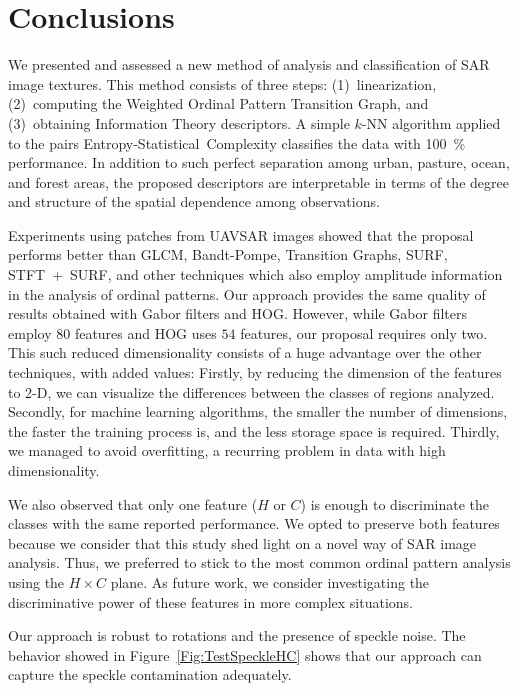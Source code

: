 \documentclass[journal]{IEEEtran}
\begin{document}
	\section{Conclusions}\label{Conclusion}
	
	We presented and assessed a new method of analysis and classification of SAR image textures.
	This method consists of three steps: 
	(1)~linearization, 
	(2)~computing the Weighted Ordinal Pattern Transition Graph, and 
	(3)~obtaining Information Theory descriptors.
	A simple $k$-NN algorithm applied to the pairs Entropy-Statistical~Complexity classifies the data with \SI{100}{\percent} performance.
	In addition to such perfect separation among urban, pasture, ocean, and forest areas, the proposed descriptors are interpretable in terms of the degree and structure of the spatial dependence among observations.
	
	Experiments using patches from UAVSAR images showed that the proposal performs better than GLCM, Bandt-Pompe, Transition Graphs, SURF, \mbox{STFT + SURF}, and other techniques which also employ amplitude information in the analysis of ordinal patterns. 
	Our approach provides the same quality of results obtained with Gabor filters and HOG.
	However, while Gabor filters employ $80$ features and HOG uses $54$ features, our proposal requires only two.
	This such reduced dimensionality consists of a huge advantage over the other techniques, with added values:
	Firstly, by reducing the dimension of the features to \mbox{2-D}, we can visualize the differences between the classes of regions analyzed.
	Secondly, for machine learning algorithms, the smaller the number of dimensions, the faster the training process is, and the less storage space is required.
	Thirdly, we managed to avoid overfitting, a recurring problem in data with high dimensionality.
	
	We also observed that only one feature ($H$ or $C$) is enough to discriminate the classes with the same reported performance. We opted to preserve both features because we consider that this study shed light on a novel way of SAR image analysis. Thus, we preferred to stick to the most common ordinal pattern analysis using the $H \times C $ plane. As future work, we consider investigating the discriminative power of these features in more complex situations.
	
	Our approach is robust to rotations and the presence of speckle noise. The behavior showed in Figure~\ref{Fig:TestSpeckleHC} shows that our approach can capture the speckle contamination adequately.
	
\end{document}

